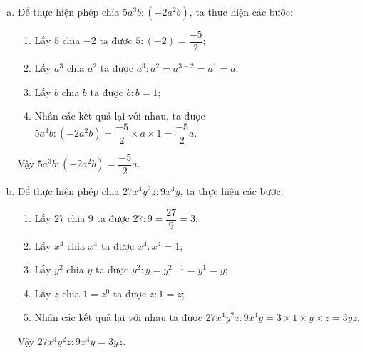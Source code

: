 \begin{vd}
{\begin{enumerate}[a)]
\begin{enumerate}[\tickEX]
		\item Nhân các kết quả lại với nhau, ta được $18x^2y^2z:8xyz=\dfrac{9}{4}\times x\times y\times 1=\dfrac{9}{4}xy$.
	\end{enumerate}
	Vậy $18x^2y^2z:8xyz=\dfrac{9}{4}xy$.
	\item Để thực hiện phép chia $5a^3b:(-2a^2b)$, ta thực hiện các bước:
	\begin{enumerate}[\tickEX]
		\item Lấy $5$ chia $-2$ ta được $5:(-2)=\dfrac{-5}{2}$;
		\item Lấy $a^3$ chia $a^2$ ta được $a^3:a^2=a^{3-2}=a^1=a$;
		\item Lấy $b$ chia $b$ ta được $b:b=1$;
		\item Nhân các kết quả lại với nhau, ta được $5a^3b:(-2a^2b)=\dfrac{-5}{2}\times a\times 1=\dfrac{-5}{2}a$.
	\end{enumerate}
	Vậy $5a^3b:(-2a^2b)=\dfrac{-5}{2}a$.
	\item Để thực hiện phép chia $27x^4y^2z:9x^4y$, ta thực hiện các bước:
	\begin{enumerate}[\tickEX]
		\item Lấy $27$ chia $9$ ta được $27:9=\dfrac{27}{9}=3$;
		\item Lấy $x^4$ chia $x^4$ ta được $x^4:x^4=1$;
		\item Lấy $y^2$ chia $y$ ta được $y^2:y=y^{2-1}=y^1=y$;
		\item Lấy $z$ chia $1=z^0$ ta được $z:1=z$;
		\item Nhân các kết quả lại với nhau ta được $27x^4y^2z:9x^4y=3\times 1\times y\times z=3yz$.
	\end{enumerate}
	Vậy $27x^4y^2z:9x^4y=3yz$.
\end{enumerate}
}
\end{vd}

